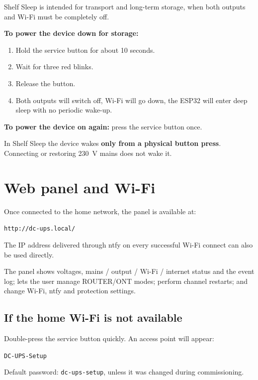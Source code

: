 \documentclass[10.5pt,a5paper]{article}
\begin{document}
Shelf Sleep is intended for transport and long-term storage, when both outputs and Wi-Fi must be completely off.

\textbf{To power the device down for storage:}
\begin{enumerate}
  \item Hold the service button for about 10 seconds.
  \item Wait for three red blinks.
  \item Release the button.
  \item Both outputs will switch off, Wi-Fi will go down, the ESP32 will enter deep sleep with no periodic wake-up.
\end{enumerate}

\textbf{To power the device on again:} press the service button once.

\begin{warnbox}[title=Important]
In Shelf Sleep the device wakes \textbf{only from a physical button press}. Connecting or restoring 230~V mains does not wake it.
\end{warnbox}

\section{Web panel and Wi-Fi}

Once connected to the home network, the panel is available at:
\begin{center}
\large\texttt{http://dc-ups.local/}
\end{center}

The IP address delivered through ntfy on every successful Wi-Fi connect can also be used directly.

The panel shows voltages, mains / output / Wi-Fi / internet status and the event log; lets the user manage ROUTER/ONT modes; perform channel restarts; and change Wi-Fi, ntfy and protection settings.

\subsection{If the home Wi-Fi is not available}
Double-press the service button quickly. An access point will appear:

\begin{center}
\texttt{DC-UPS-Setup}
\end{center}

Default password: \texttt{dc-ups-setup}, unless it was changed during commissioning.
\end{document}

